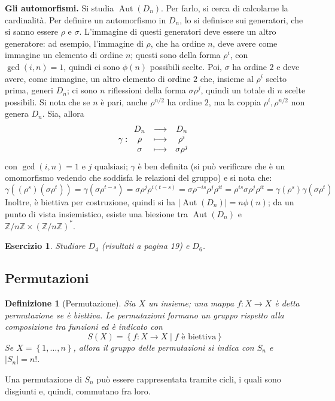 \documentclass[12pt]{scrartcl}
\theoremstyle{style}
\newtheorem{definizione}{Definizione}[section]
\newtheorem{esercizio}{Esercizio}[section]
\numberwithin{equation}{subsection}
\begin{document}
\vspace{5pt}
\textbf{Gli automorfismi.} 
Si studia $\operatorname{Aut} (D_n)$. Per farlo, si cerca di calcolarne la cardinalit\`a.
Per definire un automorfismo in $D_n$, lo si definisce sui generatori, che si sanno essere $\rho $ e $\sigma $.
L'immagine di questi generatori deve essere un altro generatore: ad esempio, l'immagine di $\rho $, che ha ordine $n$, deve avere come immagine un elemento di ordine $n$; questi sono della forma $\rho ^i$, con $\operatorname{gcd}(i,n) =1$, quindi ci sono $\phi (n)$ possibili scelte.
Poi, $\sigma $ ha ordine $2$ e deve avere, come immagine, un altro elemento di ordine $2$ che, insieme al $\rho ^i$ scelto prima, generi $D_n$; ci sono $n$ riflessioni della forma $\sigma \rho ^j$, quindi un totale di $n$ scelte possibili.
Si nota che se $n$ \`e pari, anche $\rho ^{ n / 2} $ ha ordine $2$, ma la coppia $\rho ^i, \rho ^{n / 2} $ non genera $D_n$.
Sia, allora 
\[
\gamma : 
\begin{array}
	{c c c}
	D_n & \longrightarrow & D_n\\
	\rho & \longmapsto & \rho ^{i} \\
	\sigma & \longmapsto & \sigma \rho ^j 
\end{array}
\] 
con $\operatorname{gcd}(i,n) =1$ e $j$ qualsiasi; $\gamma$ \`e ben definita (si pu\`o verificare che \`e un omomorfismo vedendo che soddisfa le relazioni del gruppo) e si nota che:
\[
\gamma\left((\rho ^s)(\sigma \rho ^t)\right) = \gamma(\sigma \rho ^{t-s} )= \sigma \rho ^j \rho ^{i(t-s)} = \sigma \rho ^{-is} \rho ^j \rho ^{it} = \rho ^{is} \sigma \rho ^j\rho ^{it} = \gamma(\rho ^s)\gamma(\sigma \rho ^t)
\] 
Inoltre, \`e biettiva per costruzione, quindi si ha $\lvert \operatorname{Aut} (D_n) \rvert = n \phi (n)$; da un punto di vista insiemistico, esiste una biezione tra $\operatorname{Aut} (D_n)$ e $\mathbb{Z} / n\mathbb{Z} \times \left(\mathbb{Z} / n\mathbb{Z}\right) ^*$.
\begin{esercizio}
	Studiare $D_4$ (risultati a pagina 19) e $D_6$.
\end{esercizio}
\subsection{Permutazioni}
\begin{definizione}
	[Permutazione]	
	Sia $X$ un insieme; una mappa $f : X \to X$ \`e detta \textit{permutazione} se \`e biettiva. 
	Le permutazioni formano un gruppo rispetto alla composizione tra funzioni ed \`e indicato con
	\[
	S(X) = \left\{ f : X \to X  \mid  f \text{ \`e biettiva} \right\} 
	\] 
	Se $X = \left\{ 1,\ldots, n \right\} $, allora il gruppo delle permutazioni si indica con $S_n$ e $\lvert S_n \rvert  = n!$.
\end{definizione}
\noindent Una permutazione di $S_n$ pu\`o essere rappresentata tramite cicli, i quali sono disgiunti e, quindi, commutano fra loro.
\end{document}
